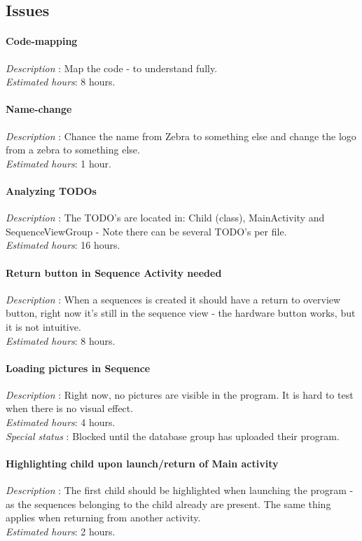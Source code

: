 \subsection{Issues}

\paragraph{Code-mapping}
\emph{Description} : Map the code - to understand fully.\\
\emph{Estimated hours}: 8 hours.
\paragraph{Name-change}
\emph{Description} : Chance the name from Zebra to something else and change the logo from a zebra to something else.\\
\emph{Estimated hours}: 1 hour.
\paragraph{Analyzing TODOs}
\emph{Description} : The TODO's are located in: Child (class), MainActivity and SequenceViewGroup - Note there can be several TODO's per file. \\
\emph{Estimated hours}: 16 hours.
\paragraph{Return button in Sequence Activity needed}
\emph{Description} : When a sequences is created it should have a return to overview button, right now it's still in the sequence view - the hardware button works, but it is not intuitive.\\
\emph{Estimated hours}: 8 hours.
\paragraph{Loading pictures in Sequence}
\emph{Description} : Right now, no pictures are visible in the program. It is hard to test when there is no visual effect.\\
\emph{Estimated hours}: 4 hours.\\
\emph{Special status} : Blocked until the database group has uploaded their program.
\paragraph{Highlighting child upon launch/return of Main activity}
\emph{Description} : The first child should be highlighted when launching the program - as the sequences belonging to the child already are present. The same thing applies when returning from another activity.\\
\emph{Estimated hours}: 2 hours.
